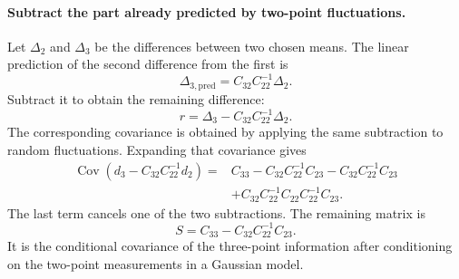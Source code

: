 \documentclass[11pt]{article}
\begin{document}
\paragraph{Subtract the part already predicted by two-point fluctuations.}
Let $\Delta_2$ and $\Delta_3$ be the differences between two chosen means.
The linear prediction of the second difference from the first is
\begin{equation}
 \Delta_{3,\mathrm{pred}}=C_{32}C_{22}^{-1}\Delta_2.
\end{equation}
Subtract it to obtain the remaining difference:
\begin{equation}
 r=\Delta_3-C_{32}C_{22}^{-1}\Delta_2.
\end{equation}
The corresponding covariance is obtained by applying the same subtraction
to random fluctuations. Expanding that covariance gives
\begin{equation}
\begin{split}
 \operatorname{Cov}(d_3-C_{32}C_{22}^{-1}d_2)
 ={}& C_{33}-C_{32}C_{22}^{-1}C_{23}
      -C_{32}C_{22}^{-1}C_{23}\\
    &+C_{32}C_{22}^{-1}C_{22}C_{22}^{-1}C_{23}.
\end{split}
\end{equation}
The last term cancels one of the two subtractions. The remaining matrix is
\begin{equation}
 S=C_{33}-C_{32}C_{22}^{-1}C_{23}.
\end{equation}
It is the conditional covariance of the three-point information after
conditioning on the two-point measurements in a Gaussian model.
\end{document}
